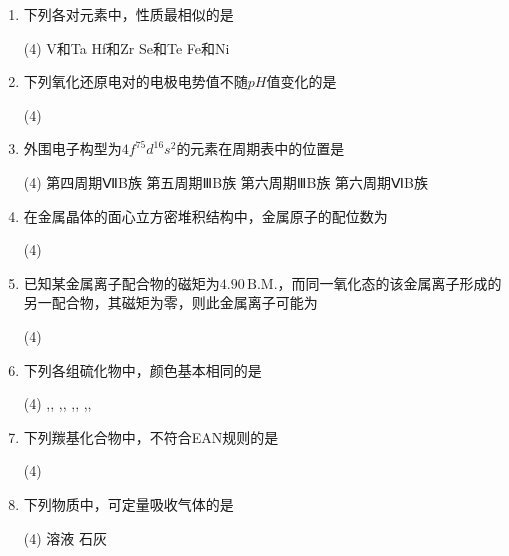 \begin{enumerate}[label=\arabic*., itemsep=1.5ex]
    \item 下列各对元素中，性质最相似的是
    \begin{tasks}(4)
        \task V和Ta
        \task Hf和Zr
        \task Se和Te
        \task Fe和Ni
    \end{tasks}
    \item 下列氧化还原电对的电极电势值不随$pH$值变化的是
    \begin{tasks}(4)
        \task {}
        \task {}
        \task {}
        \task {}
    \end{tasks}
    \item 外围电子构型为$4f^75d^16s^2$的元素在周期表中的位置是
    \begin{tasks}(4)
        \task 第四周期ⅦB族
        \task 第五周期ⅢB族
        \task 第六周期ⅢB族
        \task 第六周期ⅥB族
    \end{tasks}
    \item 在金属晶体的面心立方密堆积结构中，金属原子的配位数为
    \begin{tasks}(4)
    \end{tasks}
    \item 已知某金属离子配合物的磁矩为$4.90\,\text{B.M.}$，而同一氧化态的该金属离子形成的另一配合物，其磁矩为零，则此金属离子可能为
    \begin{tasks}(4)
        \task {}
        \task {}
        \task {}
        \task {}
    \end{tasks}
    \item 下列各组硫化物中，颜色基本相同的是
    \begin{tasks}(4)
        \task {},,
        \task {},,
        \task {},,
        \task {},,
    \end{tasks}
    \item 下列羰基化合物中，不符合EAN规则的是
    \begin{tasks}(4)
        \task \ce{[Fe(CO)5]}
        \task \ce{[Co2(CO)8]}
        \task \ce{[Co(CO)4]}
        \task \ce{[Ni(CO)4]}
    \end{tasks}
    \item 下列物质中，可定量吸收气体的是
    \begin{tasks}(4)
        \task {}溶液
        \task 石灰

\end{tasks}
\end{enumerate}
